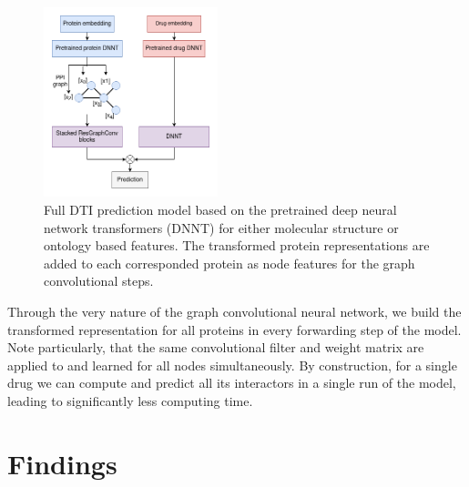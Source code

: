 \documentclass{bioinfo}
\begin{document}
\begin{figure}[!tpb]
	\centerline{\includegraphics[width=0.45\textwidth]{figures/full_model.png}}
	\caption{Full DTI prediction model based on the pretrained deep neural network transformers (DNNT) for either molecular structure or ontology based features. The transformed protein representations are added to each corresponded protein as node features for the graph convolutional steps. }
	\label{fig:Fullmodel}
\end{figure}

Through the very nature of the graph convolutional neural network, we build the transformed representation for all proteins in every forwarding step of the model. Note particularly, that the same convolutional filter and weight matrix are applied to and learned for all nodes simultaneously. By construction, for a single drug we can compute and predict all its interactors in a single run of the model, leading to significantly less computing time. 








\section{Findings}
\end{document}
